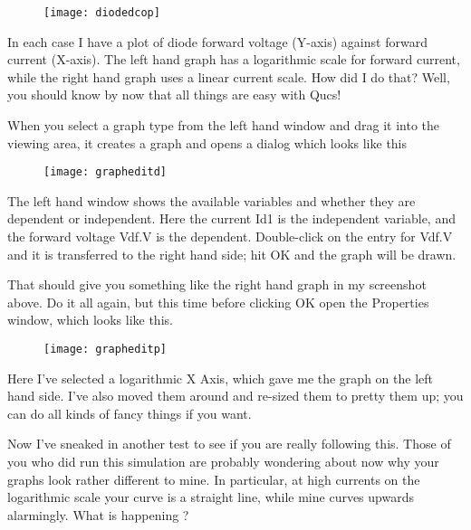 \begin{figure}[ht]
  \centering
  \texttt{[image: diodedcop]}
  \label{fig:diodedcop}
\end{figure}
\FloatBarrier

In each case I have a plot of diode forward voltage (Y-axis) against
forward current (X-axis).  The left hand graph has a logarithmic scale
for forward current, while the right hand graph uses a linear current
scale.  How did I do that? Well, you should know by now that all
things are easy with Qucs!

\addvspace{12pt}

When you select a graph type from the left hand window and drag it
into the viewing area, it creates a graph and opens a dialog which
looks like this
\begin{figure}[ht]
  \centering
  \texttt{[image: grapheditd]}
  \label{fig:grapheditd}
\end{figure}
\FloatBarrier

The left hand window shows the available variables and whether they
are dependent or independent. Here the current Id1 is the independent
variable, and the forward voltage Vdf.V is the dependent. Double-click
on the entry for Vdf.V and it is transferred to the right hand side;
hit OK and the graph will be drawn.

\addvspace{12pt}

That should give you something like the right hand graph in my
screenshot above.  Do it all again, but this time before clicking OK
open the Properties window, which looks like this.
\begin{figure}[ht]
  \centering
  \texttt{[image: grapheditp]}
  \label{fig:grapheditp}
\end{figure}
\FloatBarrier

Here I've selected a logarithmic X Axis, which gave me the graph on
the left hand side.  I've also moved them around and re-sized them to
pretty them up; you can do all kinds of fancy things if you want.

\addvspace{12pt}

Now I've sneaked in another test to see if you are really following
this. Those of you who did run this simulation are probably wondering
about now why your graphs look rather different to mine. In
particular, at high currents on the logarithmic scale your curve is a
straight line, while mine curves upwards alarmingly. What is happening
?

\addvspace{12pt}

